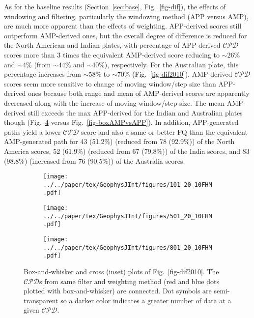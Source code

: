 As for the baseline results (Section~\ref{sec:base}, Fig.~\ref{fig-dif}), the
effects of windowing and filtering, particularly the windowing method (APP
versus AMP), are much more apparent than the effects of weighting. APP-derived
scores still outperform AMP-derived ones, but the overall degree of difference
is reduced for the North American and Indian plates, with percentage of
APP-derived $\mathcal{CPD}$ scores more than 3 times the equivalent AMP-derived
score reducing to ${\sim}26$\% and ${\sim}4$\% (from ${\sim}44$\% and
${\sim}40$\%), respectively. For the Australian plate, this percentage increases
from ${\sim}58$\% to ${\sim}70$\% (Fig.~\ref{fig-dif2010}). AMP-derived
$\mathcal{CPD}$ scores seem more sensitive to change of moving window/step size
than APP-derived ones because both range and mean of AMP-derived scores are
apparently decreased along with the increase of moving window/step size. The
mean AMP-derived still exceeds the max APP-derived for the Indian and Australian
plates though (Fig.~\ref{fig-boxAMPvsAPP2010} versus
Fig.~\ref{fig-boxAMPvsAPP}). In addition, APP-generated paths yield a lower
$\mathcal{CPD}$ score and also a same or better FQ than the equivalent
AMP-generated path for 43 (51.2\%) (reduced from 78 (92.9\%)) of the North
America scores, 52 (61.9\%) (reduced from 67 (79.8\%)) of the India scores, and
83 (98.8\%) (increased from 76 (90.5\%)) of the Australia scores.

\begin{figure}
  \captionsetup[subfigure]{singlelinecheck=off,justification=raggedright,aboveskip=0pt,belowskip=-6pt}
  \centering
  \begin{subfigure}{1\textwidth}
    \caption{}\label{fig-na-boxAMPvsAPP2010}
    \texttt{[image: ../../paper/tex/GeophysJInt/figures/101\_20\_10FHM.pdf]}
  \end{subfigure}
  \vspace{.1em}
  \begin{subfigure}{1\textwidth}
    \caption{}\label{fig-in-boxAMPvsAPP2010}
    \texttt{[image: ../../paper/tex/GeophysJInt/figures/501\_20\_10FHM.pdf]}
  \end{subfigure}
  \vspace{.1em}
  \begin{subfigure}{1\textwidth}
    \caption{}\label{fig-au-boxAMPvsAPP2010}
    \texttt{[image: ../../paper/tex/GeophysJInt/figures/801\_20\_10FHM.pdf]}
  \end{subfigure}
  \caption[Box-and-whisker and cross (inset) plots of Fig.~\ref{fig-dif2010}]{Box-and-whisker and cross (inset) plots of Fig.~\ref{fig-dif2010}.
The $\mathcal{CPD}$s from same filter and weighting method (red and blue dots
plotted with box-and-whisker) are connected. Dot symbols are semi-transparent so
a darker color indicates a greater number of data at a given
$\mathcal{CPD}$.}\label{fig-boxAMPvsAPP2010}
\end{figure}

